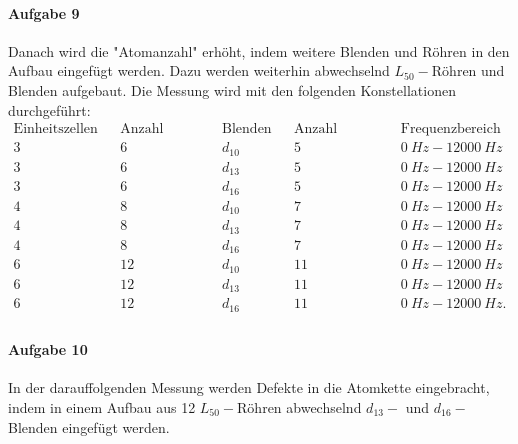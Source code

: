 \paragraph{Aufgabe 9}
Danach wird die "Atomanzahl" erhöht, indem weitere Blenden und Röhren in den Aufbau eingefügt werden.
Dazu werden weiterhin abwechselnd $L_{50}-$Röhren und Blenden aufgebaut.
Die Messung wird mit den folgenden Konstellationen durchgeführt:\\
\begin{align*}
\text{Einheitszellen} && \text{Anzahl Röhren}  && \text{Blenden}   && \text{Anzahl Blenden}  && \text{Frequenzbereich}\\
  3                   &&  6             && d_{10}           &&  5             && \SI{0}{Hz}-\SI{12000}{Hz} \\
  3                   &&  6             && d_{13}           &&  5             && \SI{0}{Hz}-\SI{12000}{Hz} \\
  3                   &&  6             && d_{16}           &&  5             && \SI{0}{Hz}-\SI{12000}{Hz} \\
  4                   &&  8             && d_{10}           &&  7             && \SI{0}{Hz}-\SI{12000}{Hz} \\
  4                   &&  8             && d_{13}           &&  7             && \SI{0}{Hz}-\SI{12000}{Hz} \\
  4                   &&  8             && d_{16}           &&  7             && \SI{0}{Hz}-\SI{12000}{Hz} \\
  6                   && 12             && d_{10}           && 11             && \SI{0}{Hz}-\SI{12000}{Hz} \\
  6                   && 12             && d_{13}           && 11             && \SI{0}{Hz}-\SI{12000}{Hz} \\
  6                   && 12             && d_{16}           && 11             && \SI{0}{Hz}-\SI{12000}{Hz}.\\
\end{align*}
%
\paragraph{Aufgabe 10}
In der darauffolgenden Messung werden Defekte in die Atomkette eingebracht, indem in einem Aufbau aus 12 $L_{50}-$Röhren abwechselnd $d_{13}-$ und $d_{16}-$Blenden eingefügt werden.\\
%
